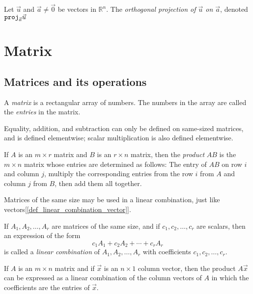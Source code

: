 \documentclass{report}
\begin{document}
		\begin{defn}[Projection]
			Let $\vec{u}$ and $\vec{a} \ne \vec{0}$ be vectors in $\mathbb{R}^n$. The \emph{orthogonal projection of $\vec{u}$ on $\vec{a}$}, denoted $\verb|proj|_{\vec{a}}\vec{u}$
		\end{defn}
	
	\section{Matrix}
		\subsection{Matrices and its operations}
			\begin{defn}[Matrix]
				A \emph{matrix} is a rectangular array of numbers. The numbers in the array are called the \emph{entries} in the matrix.
			\end{defn}
		
			Equality, addition, and subtraction can only be defined on same-sized matrices, and is defined elementwise; scalar multiplication is also defined elementwise.
			
			\begin{defn}
				If $A$ is an $m \times r$ matrix and $B$ is an $r \times n$ matrix, then the \emph{product} $AB$ is the $m \times n$ matrix whose entries are determined as follows:
				The entry of $AB$ on row $i$ and column $j$, multiply the corresponding entries from the row $i$ from $A$ and column $j$ from $B$, then add them all together.
			\end{defn}
		
			Matrices of the same size may be used in a linear combination, just like vectors[\ref{def_linear_combination_vector}].
			
			\begin{defn}
				If $A_1, A_2, \dots, A_r$ are matrices of the same size, and if $c_1, c_2, \dots, c_r$ are scalars, then an expression of the form
				\begin{displaymath}
					c_1A_1+c_2A_2+\cdots+c_rA_r
				\end{displaymath}
				is called a \emph{linear combination} of $A_1, A_2, \dots, A_r$ with coefficients $c_1, c_2, \dots, c_r$.
			\end{defn}
			
			\begin{thm}
				If $A$ is an $m \times n$ matrix and if $\vec{x}$ is an $n \times 1$ column vector, then the product $A\vec{x}$ can be expressed as a linear combination of the column vectors of $A$ in which the coefficients are the entries of $\vec{x}$.
			\end{thm}
			
\end{document}
